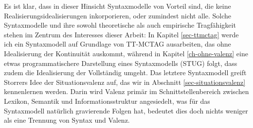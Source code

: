 Es ist klar, dass in dieser Hinsicht Syntaxmodelle von Vorteil sind, die keine Realisierungsidealisierungen inkorporieren, oder zumindest nicht alle. Solche Syntaxmodelle und ihre sowohl theoretische als auch empirische Tragfähigkeit stehen im Zentrum des Interesses dieser Arbeit: In Kapitel \ref{sec-ttmctag} werde ich ein Syntaxmodell auf Grundlage von TT-MCTAG ausarbeiten, das ohne Idealisierung der Kontinuität auskommt, während in Kapitel \ref{ch-ohne-valenz} eine etwas programmatischere Darstellung eines Syntaxmodells (STUG) folgt, dass zudem die Idealisierung der Vollständig umgeht. Das letztere Syntaxmodell greift Storrers Idee der Situationsvalenz auf, das wir in Abschnitt \ref{sec-situationsvalenz} kennenlernen werden. Darin wird Valenz primär im Schnittstellenbereich zwischen Lexikon, Semantik und Informationsstruktur angesiedelt, was für das Syntaxmodell natürlich gravierende Folgen hat, bedeutet dies doch nichts weniger als eine Trennung von Syntax und Valenz.  

